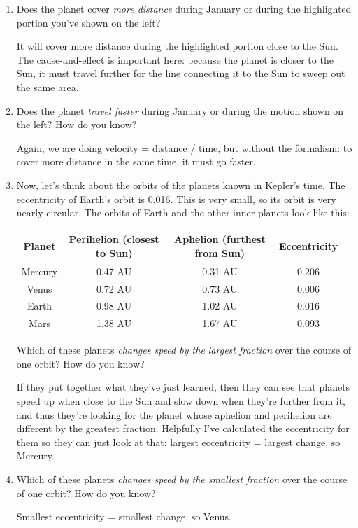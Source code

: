 \documentclass[12pt]{article}
\newcommand{\red}{\color{red}}
\begin{document}
\begin{enumerate}
{\red People will try to overcomplicate this: it's exactly one month. Same area $\rightarrow$ same time. You may need to remind the students that Jan 1 to Feb 1 is one month.}

\vspace{1.5in}

\item Does the planet cover {\it more distance} during January or during the highlighted portion you've shown on the left?

{\red It will cover more distance during the highlighted portion close to the Sun. The cause-and-effect is important here: because the planet is closer to the Sun, it must travel further for the line connecting it to the Sun to sweep out the same area.}




\item {Does the planet {\it travel faster} during January or during the motion shown on the left? How do you know?}

{\red Again, we are doing velocity = distance / time, but without the formalism: to cover more distance in the same time, it must go faster.}




\item Now, let's think about the orbits of the planets known in Kepler's time. The eccentricity of Earth's orbit is 0.016. This is very small, so its orbit is very nearly circular. The orbits of Earth and the other inner planets look like this:

\begin{tabular}{|c|c|c|c|c|}
\hline
Planet & Perihelion (closest to Sun) & Aphelion (furthest from Sun) & Eccentricity \\ \hline
Mercury & 0.47 AU & 0.31 AU & 0.206 \\ \hline
Venus & 0.72 AU & 0.73 AU & 0.006\\ \hline
Earth &  0.98 AU & 1.02 AU & 0.016\\ \hline
Mars & 1.38 AU & 1.67 AU & 0.093 \\ \hline
\end{tabular}

Which of these planets {\it changes speed by the largest fraction} over the course of one orbit? How do you know?

{\red If they put together what they've just learned, then they can see that planets speed up when close to the Sun and slow down when they're further from it, and thus they're looking for the planet whose aphelion and perihelion are different by the greatest fraction. Helpfully I've calculated the eccentricity for them so they can just look at that: largest eccentricity = largest change, so Mercury.}

\vspace{1in}

\item Which of these planets {\it changes speed by the smallest fraction} over the course of one orbit? How do you know?

{\red Smallest eccentricity = smallest change, so Venus.}

\end{enumerate}
\end{document}
